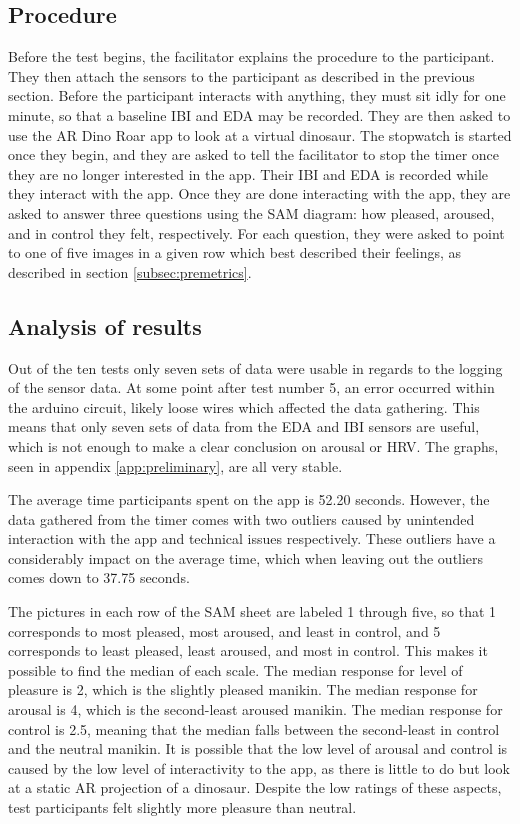 \subsection{Procedure}
Before the test begins, the facilitator explains the procedure to the participant. They then attach the sensors to the participant as described in the previous section. Before the participant interacts with anything, they must sit idly for one minute, so that a baseline IBI and EDA may be recorded. They are then asked to use the AR Dino Roar app to look at a virtual dinosaur. The stopwatch is started once they begin, and they are asked to tell the facilitator to stop the timer once they are no longer interested in the app. Their IBI and EDA is recorded while they interact with the app. Once they are done interacting with the app, they are asked to answer three questions using the SAM diagram: how pleased, aroused, and in control they felt, respectively. For each question, they were asked to point to one of five images in a given row which best described their feelings, as described in section \ref{subsec:premetrics}.

\subsection{Analysis of results}
Out of the ten tests only seven sets of data were usable in regards to the logging of the sensor data. At some point after test number 5, an error occurred within the arduino circuit, likely loose wires which affected the data gathering. This means that only seven sets of data from the EDA and IBI sensors are useful, which is not enough to make a clear conclusion on arousal or HRV. The graphs, seen in appendix \ref{app:preliminary}, are all very stable.

The average time participants spent on the app is 52.20 seconds. However, the data gathered from the timer comes with two outliers caused by unintended interaction with the app and technical issues respectively. These outliers have a considerably impact on the average time, which when leaving out the outliers comes down to 37.75 seconds. 

The pictures in each row of the SAM sheet are labeled 1 through five, so that 1 corresponds to most pleased, most aroused, and least in control, and 5 corresponds to least pleased, least aroused, and most in control. This makes it possible to find the median of each scale. The median response for level of pleasure is 2, which is the slightly pleased manikin. The median response for arousal is 4, which is the second-least aroused manikin. The median response for control is 2.5, meaning that the median falls between the second-least in control and the neutral manikin. It is possible that the low level of arousal and control is caused by the low level of interactivity to the app, as there is little to do but look at a static AR projection of a dinosaur. Despite the low ratings of these aspects, test participants felt slightly more pleasure than neutral. 

